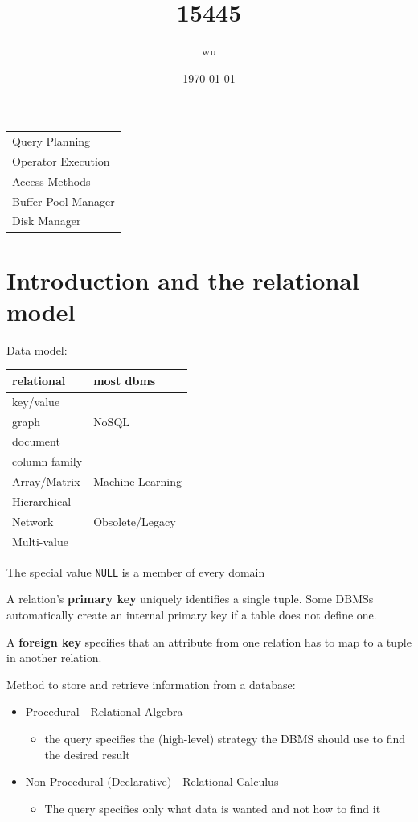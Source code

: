 \documentclass[11pt]{article}
\author{wu}
\date{\today}
\title{15445}
\begin{document}
\maketitle
\tableofcontents

\begin{center}
\begin{tabular}{l}
Query Planning\\
Operator Execution\\
Access Methods\\
Buffer Pool Manager\\
Disk Manager\\
\end{tabular}
\end{center}
\section{Introduction and the relational model}
\label{sec:org229a7ec}
Data model:

\begin{center}
\begin{tabular}{ll}
relational & most dbms\\
\hline
key/value & \\
graph & NoSQL\\
document & \\
column family & \\
\hline
Array/Matrix & Machine Learning\\
\hline
Hierarchical & \\
Network & Obsolete/Legacy\\
Multi-value & \\
\end{tabular}
\end{center}


The special value \texttt{NULL} is a member of every domain

A relation's \textbf{primary key} uniquely identifies a single tuple. Some DBMSs automatically create an
internal primary key if a table does not define one.

A \textbf{foreign key} specifies that an attribute from one relation has to map to a tuple in another
relation.

Method to store and retrieve information from a database:
\begin{itemize}
\item Procedural - Relational Algebra
\begin{itemize}
\item the query specifies the (high-level) strategy the DBMS should use to find the desired result
\end{itemize}
\item Non-Procedural (Declarative) - Relational Calculus
\begin{itemize}
\item The query specifies only what data is wanted and not how to find it
\end{itemize}
\end{itemize}
\end{document}
